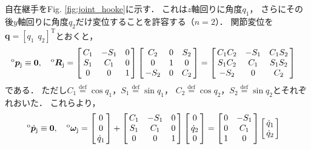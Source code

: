 ﻿\documentclass[a4paper]{jsarticle}
\begin{document}
自在継手をFig. \ref{fig:joint_hooke}に示す．
これは$z$軸回りに角度$q_{1}$，
さらにその後$y$軸回りに角度$q_{2}$だけ変位することを許容する（$n=2$）．
関節変位を$\bm{q}=[q_{1}~~q_{2}]^{\mathrm{T}}$とおくと，
\begin{align*}
&{}^{\mathrm{o}}\bm{p}_{\mathrm{j}}\equiv\bm{0},\quad
{}^{\mathrm{o}}\bm{R}_{\mathrm{j}}=\left[\begin{array}{@{\,}ccc@{\,}}
 C_{1} &-S_{1} & 0 \\
 S_{1} & C_{1} & 0 \\
 0 & 0 & 1 \\
\end{array}\right]\left[\begin{array}{@{\,}ccc@{\,}}
 C_{2} & 0 & S_{2} \\
 0 & 1 & 0 \\
-S_{2} & 0 & C_{2} \\
\end{array}\right]=\left[\begin{array}{@{\,}ccc@{\,}}
 C_{1}C_{2} &-S_{1} & C_{1}S_{2} \\
 S_{1}C_{2} & C_{1} & S_{1}S_{2} \\
     -S_{2} & 0     &      C_{2} \\
\end{array}\right]
\end{align*}
である．
ただし$C_{1}\overset{\mathrm{def}}{=}\cos q_{1}$，$S_{1}\overset{\mathrm{def}}{=}\sin q_{1}$，
$C_{2}\overset{\mathrm{def}}{=}\cos q_{2}$，$S_{2}\overset{\mathrm{def}}{=}\sin q_{2}$とそれぞれおいた．
これらより，
\begin{align*}
{}^{\mathrm{o}}\dot{\bm{p}}_{\mathrm{j}}\equiv\bm{0},\quad
{}^{\mathrm{o}}\bm{\omega}_{\mathrm{j}}
&=\left[\begin{array}{@{\,}c@{\,}}
 0 \\ 0 \\ \dot{q}_{1}
\end{array}\right]
 +\left[\begin{array}{@{\,}ccc@{\,}}
 C_{1} &-S_{1} & 0 \\
 S_{1} & C_{1} & 0 \\
 0 & 0 & 1 \\
\end{array}\right]\left[\begin{array}{@{\,}c@{\,}}
 0 \\ \dot{q}_{2} \\ 0
\end{array}\right]
=\left[\begin{array}{@{\,}cc@{\,}}
 0 &-S_{1} \\
 0 & C_{1} \\
 1 & 0     \\
\end{array}\right]\left[\begin{array}{@{\,}c@{\,}}
 \dot{q}_{1} \\ \dot{q}_{2}
\end{array}\right]
\end{align*}
\end{document}
